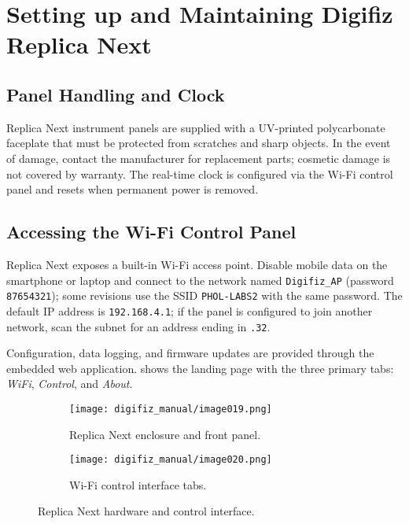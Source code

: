 \chapter{Setting up and Maintaining Digifiz Replica Next} \label{ch:replica-next-setup}

\section{Panel Handling and Clock}

Replica Next instrument panels are supplied with a UV-printed polycarbonate faceplate that must be protected from scratches and sharp objects.
In the event of damage, contact the manufacturer for replacement parts; cosmetic damage is not covered by warranty.
The real-time clock is configured via the Wi-Fi control panel and resets when permanent power is removed.

\section{Accessing the Wi-Fi Control Panel}

Replica Next exposes a built-in Wi-Fi access point.
Disable mobile data on the smartphone or laptop and connect to the network named \texttt{Digifiz\_AP} (password \texttt{87654321}); some revisions use the SSID \texttt{PHOL-LABS2} with the same password.
The default IP address is \texttt{192.168.4.1}; if the panel is configured to join another network, scan the subnet for an address ending in \texttt{.32}.

Configuration, data logging, and firmware updates are provided through the embedded web application.
 shows the landing page with the three primary tabs: \emph{WiFi}, \emph{Control}, and \emph{About}.

\begin{figure}[htbp]
    \centering
    \begin{subfigure}{0.48\textwidth}
        \texttt{[image: digifiz\_manual/image019.png]}
        \caption{Replica Next enclosure and front panel.}
    \end{subfigure}\hfill
    \begin{subfigure}{0.48\textwidth}
        \texttt{[image: digifiz\_manual/image020.png]}
        \caption{Wi-Fi control interface tabs.}
    \end{subfigure}
    \caption{Replica Next hardware and control interface.}
    \label{fig:next-control-tabs}
\end{figure}

